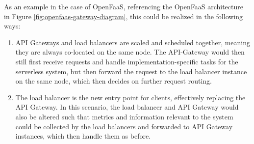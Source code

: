 As an example in the case of OpenFaaS, referencing the OpenFaaS architecture in Figure \ref{fig:openfaas-gateway-diagram}, this could be realized in the following ways:
\begin{enumerate}
    \item API Gateways and load balancers are scaled and scheduled together, meaning they are always co-located on the same node. The API-Gateway would then still first receive requests and handle implementation-specific tasks for the serverless system, but then forward the request to the load balancer instance on the same node, which then decides on further request routing.
    \item The load balancer is the new entry point for clients, effectively replacing the API Gateway. In this scenario, the load balancer and API Gateway would also be altered such that metrics and information relevant to the system could be collected by the load balancers and forwarded to API Gateway instances, which then handle them as before.
\end{enumerate}